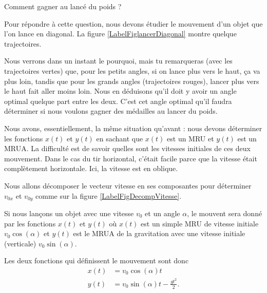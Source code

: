 \begin{pourquoidonc}
	Comment gagner au lancé du poids ?
\end{pourquoidonc}

Pour répondre à cette question, nous devons étudier le mouvement d'un objet que l'on lance en diagonal. La figure \ref{LabelFiglancerDiagonal} montre quelque trajectoires.
\newcommand{\CaptionFiglancerDiagonal}{La trajectoire de quelque mobiles lancés en diagonal.}

Nous verrons dans un instant le pourquoi, mais tu remarqueras (avec les trajectoires vertes) que, pour les petits angles, si on lance plus vers le haut, ça va plus loin, tandis que pour les grands angles (trajectoires rouges), lancer plus vers le haut fait aller moins loin. Nous en déduisons qu'il doit y avoir un angle optimal quelque part entre les deux. C'est cet angle optimal qu'il faudra déterminer si nous voulons gagner des médailles au lancer du poids.

Nous avons, essentiellement, la même situation qu'avant : nous devons déterminer les fonctions $x(t)$ et $y(t)$ en sachant que $x(t)$ est un MRU et $y(t)$ est un MRUA. La difficulté est de savoir quelles sont les vitesses initiales de ces deux mouvement. Dans le cas du tir horizontal, c'était facile parce que la vitesse était complètement horizontale. Ici, la vitesse est en oblique.

\newcommand{\CaptionFigDecompVitesse}{Tir oblique à différents angles. Un tout petit peu de trigonométrie nous donne les composantes de la vitesse initiale selon les deux axes.}


\begin{idee}
	Nous allons décomposer le vecteur vitesse en ses composantes pour déterminer $v_{0x}$ et $v_{0y}$ comme sur la figure \ref{LabelFigDecompVitesse}.
\end{idee}

Si nous lançons un objet avec une vitesse $v_0$ et un angle $\alpha$, le mouvent sera donné par les fonctions $x(t)$ et $y(t)$ où $x(t)$ est un simple MRU de vitesse initiale $v_0\cos(\alpha)$ et $y(t)$ est le MRUA de la gravitation avec une vitesse initiale (verticale) $v_0\sin(\alpha)$.

Les deux fonctions qui définissent le mouvement sont donc
\begin{subequations}		\label{EqsTirDiagonal}
	\begin{align}
		x(t)&=v_0\cos(\alpha) t\\
		y(t)&=v_0\sin(\alpha) t -\frac{ gt^2 }{ 2 }.
	\end{align}
\end{subequations}

